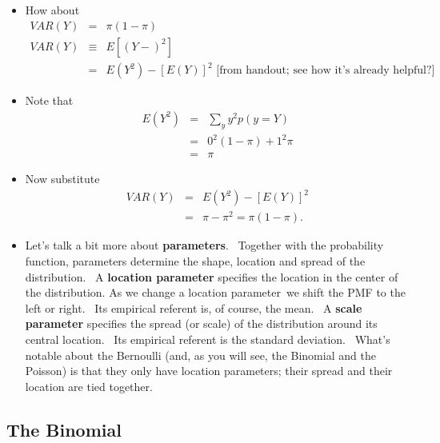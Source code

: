 \documentclass[11pt]{article}
\begin{document}
\begin{itemize}
\item How about 
\begin{eqnarray*}
VAR\left( Y\right) &=&\pi \left( 1-\pi \right) \\
VAR\left( Y\right) &\equiv &E[(Y-)^{2}] \\
&=&E(Y^{2})-\left[ E\left( Y\right) \right] ^{2}\text{ [from handout; see
how it's already helpful?]}
\end{eqnarray*}

\item Note that 
\begin{eqnarray*}
E(Y^{2}) &=&\sum_{y}y^{2}p(y=Y) \\
&=&0^{2}\left( 1-\pi \right) +1^{2}\pi \\
&=&\pi
\end{eqnarray*}

\item Now substitute%
\begin{eqnarray*}
VAR\left( Y\right) &=&E(Y^{2})-\left[ E\left( Y\right) \right] ^{2} \\
&=&\pi -\pi ^{2}=\pi \left( 1-\pi \right) .
\end{eqnarray*}

\item Let's talk a bit more about \textbf{parameters}. \ Together with the
probability function, parameters determine the shape, location and spread of
the distribution. \ A \textbf{location parameter }specifies the location in
the center of the distribution. As we change a location parameter\ we shift
the PMF to the left or right. \ Its empirical referent is, of course, the
mean. \ A \textbf{scale parameter }specifies the spread (or scale) of the
distribution around its central location. \ Its empirical referent is the
standard deviation. \ What's notable about the Bernoulli (and, as you will
see, the Binomial and the Poisson) is that they only have location
parameters; their spread and their location are tied together.
\end{itemize}

\subsection{The Binomial \ }
\end{document}
